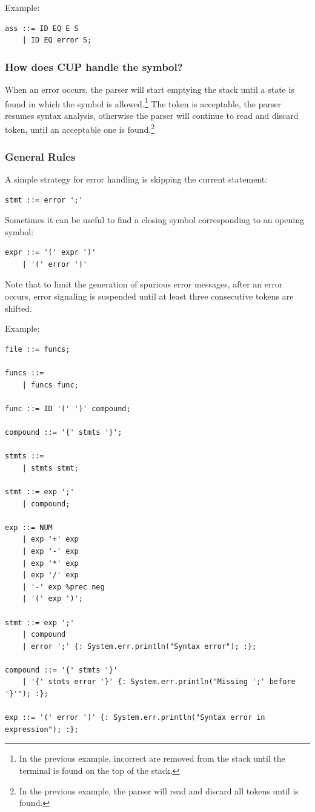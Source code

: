 Example:
\begin{lstlisting}
ass ::= ID EQ E S
    | ID EQ error S;
\end{lstlisting}

\subsubsection{How does CUP handle the  symbol?}
When an error occurs, the parser will start emptying the stack until a state is found in which the  symbol is allowed.\footnote{In the previous example, incorrect  are removed from the stack until the terminal  is found on the top of the stack.}
The  token is acceptable, the parser resumes syntax analysis, otherwise the parser will continue to read and discard token, until an acceptable one is found.\footnote{In the previous example, the parser will read and discard all tokens until  is found.}

\subsubsection{General Rules}
A simple strategy for error handling is skipping the current statement:
\begin{lstlisting}
stmt ::= error ';'
\end{lstlisting}
Sometimes it can be useful to find a closing symbol corresponding to an opening symbol:
\begin{lstlisting}
expr ::= '(' expr ')'
    | '(' error ')'
\end{lstlisting}
Note that to limit the generation of spurious error messages, after an error occurs, error signaling is suspended until at least three consecutive tokens are shifted.

Example:
\begin{lstlisting}[frame=single]
file ::= funcs;

funcs ::=
    | funcs func;

func ::= ID '(' ')' compound;

compound ::= '{' stmts '}';

stmts ::=
    | stmts stmt;

stmt ::= exp ';'
    | compound;

exp ::= NUM
    | exp '+' exp
    | exp '-' exp
    | exp '*' exp
    | exp '/' exp
    | '-' exp %prec neg
    | '(' exp ')';

stmt ::= exp ';'
    | compound
    | error ';' {: System.err.println("Syntax error"); :};

compound ::= '{' stmts '}'
    | '{' stmts error '}' {: System.err.println("Missing ';' before '}'"); :};

exp ::= '(' error ')' {: System.err.println("Syntax error in expression"); :};
\end{lstlisting}


